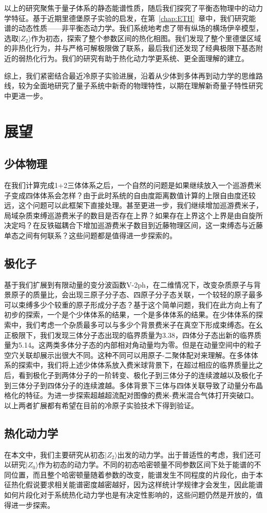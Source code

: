 以上的研究聚焦于量子体系的静态能谱性质，随后我们探究了平衡态物理中的动力学特征。基于近期里德堡原子实验的启发，在第~\ref{chap:ETH}~章中，我们研究能谱的动态性质——非平衡态动力学。我们系统地考虑了带有纵场的横场伊辛模型，选取$|Z_2\rangle$作为初态，探索了整个参数区间的热化相图。我们发现了整个里德堡区域的非热化行为，并与严格可解极限做了联系，最后我们还发现了经典极限下基态附近的弱热化行为。我们的研究有助于热化动力学更系统、更全面理解的建立。

综上，我们紧密结合最近冷原子实验进展，沿着从少体到多体再到动力学的思维路线，较为全面地研究了量子系统中新奇的物理特性，以期在理解新奇量子特性研究中更进一步。


\section{展望}
\subsection{少体物理}
在我们计算完成1+2三体体系之后，一个自然的问题是如果继续放入一个巡游费米子变成四体体系会怎样？由于此时系统的自由度距离数值计算的上限自由度还较远，这个问题可以此框架下直接处理。甚至更进一步，我们继续增加巡游费米子，局域杂质束缚巡游费米子的数目是否存在上界？如果存在上界这个上界是由自旋所决定吗？在反铁磁耦合下增加巡游费米子数目到近藤物理区间，这一束缚态与近藤单态之间有何联系？这些问题都是值得进一步探索的。

\subsection{极化子}
基于我们扩展到有限动量的变分波函数V-2ph，在二维情况下，改变杂质原子与背景原子的质量比，会出现三原子分子态、四原子分子态关联，一个较轻的原子最多可以束缚多少个较重的原子形成分子态？基于这个简单问题，我们在此方向上有了初步的探索，一个是个少体体系的结果\cite{RuijinUniversal}，一个是多体体系的结果\cite{RuijinEmergence}。在少体体系的探索中，我们考虑一个杂质最多可以与多少个背景费米子在真空下形成束缚态。在幺正极限下，我们发现三体分子态出现的临界质量为3.38，四体分子态出新的临界质量为5.14。这两类多体分子态的内部相对角动量均为零。但是在动量空间中的粒子空穴关联却展示出很大不同。这种不同可以用原子-二聚体配对来理解。在多体体系的探索中，我们将上述少体体系放入费米球背景下，在超过相应的临界质量比之后，看到极化子到两体分子的一阶转变、极化子到三体分子的连续渡越以及极化子到三体分子到四体分子的连续渡越。多体背景下三体与四体关联导致了动量分布晶格化的特征。为进一步探索超越超流配对图像的费米-费米混合气体打开突破口。以上两者扩展都有希望在目前的冷原子实验技术下得到验证。

\subsection{热化动力学}
在本文中，我们主要研究从初态$|Z_2\rangle$出发的动力学。出于普适性的考虑，我们还可以研究$|Z_0\rangle$作为初态的动力学。不同的初态哈密顿量不同参数区间下处于能谱的不同位置，而且整个哈密顿量随着参数的改变，能谱发生不同程度的片段化，由于本征热化假说要求相关能谱密度越密越好，因为这样统计学规律才会发生，因此能谱如何片段化对于系统热化动力学也是有决定性影响的，这些问题仍然是开放的，值得进一步探索。
